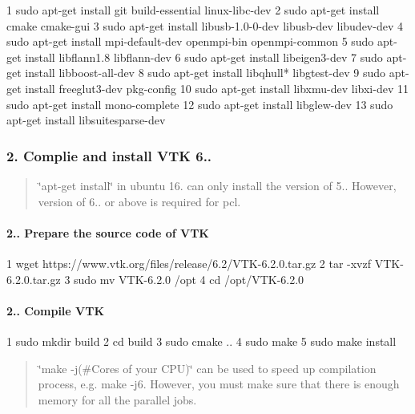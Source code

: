\begin{DoxyCode}
1 sudo apt-get install git build-essential linux-libc-dev
2 sudo apt-get install cmake cmake-gui
3 sudo apt-get install libusb-1.0-0-dev libusb-dev libudev-dev
4 sudo apt-get install mpi-default-dev openmpi-bin openmpi-common
5 sudo apt-get install libflann1.8 libflann-dev
6 sudo apt-get install libeigen3-dev
7 sudo apt-get install libboost-all-dev
8 sudo apt-get install libqhull* libgtest-dev
9 sudo apt-get install freeglut3-dev pkg-config
10 sudo apt-get install libxmu-dev libxi-dev
11 sudo apt-get install mono-complete
12 sudo apt-get install libglew-dev
13 sudo apt-get install libsuitesparse-dev
\end{DoxyCode}




\subsubsection*{2. Complie and install V\+TK 6..}

\begin{quote}
\char`\"{}apt-\/get install\char`\"{} in ubuntu 16. can only install the version of 5.. However, version of 6.. or above is required for pcl. \end{quote}


\paragraph*{2.. Prepare the source code of V\+TK}


\begin{DoxyCode}
1 wget https://www.vtk.org/files/release/6.2/VTK-6.2.0.tar.gz
2 tar -xvzf VTK-6.2.0.tar.gz
3 sudo mv VTK-6.2.0 /opt
4 cd /opt/VTK-6.2.0
\end{DoxyCode}


\paragraph*{2.. Compile V\+TK}


\begin{DoxyCode}
1 sudo mkdir build
2 cd build
3 sudo cmake ..
4 sudo make
5 sudo make install
\end{DoxyCode}


\begin{quote}
\char`\"{}make -\/j(\#\+Cores of your C\+P\+U)\char`\"{} can be used to speed up compilation process, e.\+g. make -\/j6. However, you must make sure that there is enough memory for all the parallel jobs. \end{quote}




